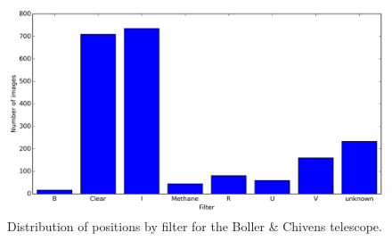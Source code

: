 \documentclass[12pt,a4paper]{report}
\newcommand{\BC}{Boller \& Chivens }
\begin{document}



\begin{figure}
\includegraphics[width=16.0cm]{filtro_IAG.png} 
\caption{Distribution of positions by filter for the \BC telescope.}
\label{Fig:filtro-IAG}
\end{figure}
\end{document}
